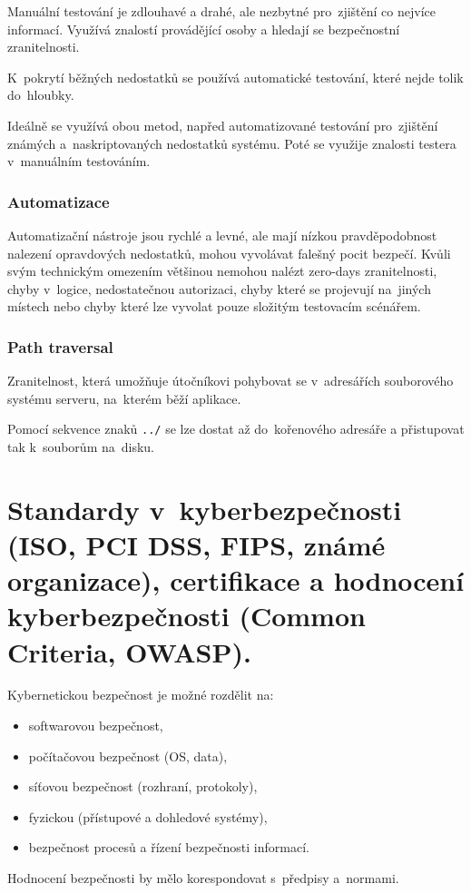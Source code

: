 Manuální testování je zdlouhavé a drahé, ale nezbytné pro~zjištění co nejvíce informací.
Využívá znalostí provádějící osoby a hledají se bezpečnostní zranitelnosti.

K~pokrytí běžných nedostatků se používá automatické testování, které nejde tolik do~hloubky.

Ideálně se využívá obou metod, napřed automatizované testování pro~zjištění známých a~naskriptovaných nedostatků systému.
Poté se využije znalosti testera v~manuálním testováním.

\subsubsection{Automatizace}

Automatizační nástroje jsou rychlé a levné, ale mají nízkou pravděpodobnost nalezení opravdových nedostatků, mohou vyvolávat falešný pocit bezpečí.
Kvůli svým technickým omezením většinou nemohou nalézt
zero-days zranitelnosti,
chyby v~logice,
nedostatečnou autorizaci,
chyby které se projevují na~jiných místech nebo
chyby které lze vyvolat pouze složitým testovacím scénářem.

\subsubsection{Path traversal}

Zranitelnost, která umožňuje útočníkovi pohybovat se v~adresářích souborového systému serveru, na~kterém běží aplikace.

Pomocí sekvence znaků \texttt{../} se lze dostat až do~kořenového adresáře a přistupovat tak k~souborům na~disku.


\clearpage
\section{Standardy v~kyberbezpečnosti (ISO, PCI DSS, FIPS, známé organizace), certifikace a hodnocení kyberbezpečnosti (Common Criteria, OWASP).}

Kybernetickou bezpečnost je možné rozdělit na:
\vspace*{-1em}\begin{itemize}
\item softwarovou bezpečnost,
\item počítačovou bezpečnost (OS, data),
\item síťovou bezpečnost (rozhraní, protokoly),
\item fyzickou (přístupové a dohledové systémy),
\item bezpečnost procesů a řízení bezpečnosti informací.
\end{itemize}
Hodnocení bezpečnosti by mělo korespondovat s~předpisy a~normami.

